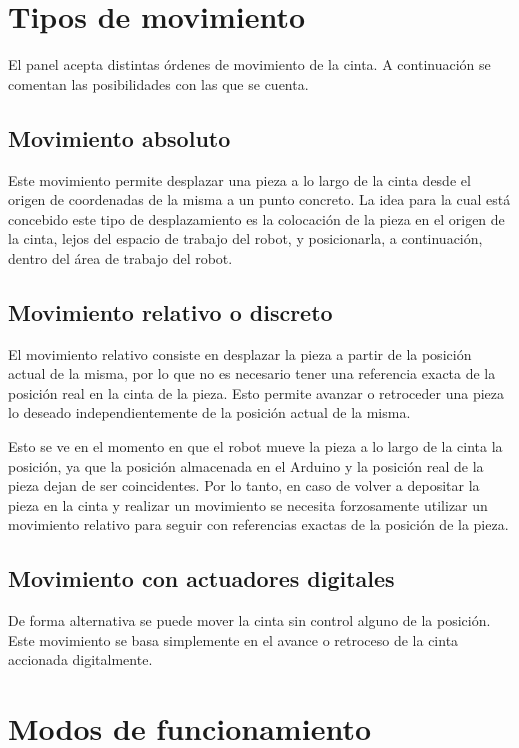 \section{Tipos de movimiento}

El panel acepta distintas órdenes de movimiento de la cinta. A continuación se comentan las posibilidades con las que se cuenta.

\subsection{Movimiento absoluto}

Este movimiento permite desplazar una pieza a lo largo de la cinta desde el origen de coordenadas de la misma a un punto concreto. La idea para la cual está concebido este tipo de desplazamiento es la colocación de la pieza en el origen de la cinta, lejos del espacio de trabajo del robot, y posicionarla, a continuación, dentro del área de trabajo del robot.

\subsection{Movimiento relativo o discreto}

El movimiento relativo consiste en desplazar la pieza a partir de la posición actual de la misma, por lo que no es necesario tener una referencia exacta de la posición real en la cinta de la pieza. Esto permite avanzar o retroceder una pieza lo deseado independientemente de la posición actual de la misma.

Esto se ve en el momento en que el robot mueve la pieza a lo largo de la cinta la posición, ya que la posición almacenada en el Arduino y la posición real de la pieza dejan de ser coincidentes. Por lo tanto, en caso de volver a depositar la pieza en la cinta y realizar un movimiento se necesita forzosamente utilizar un movimiento relativo para seguir con referencias exactas de la posición de la pieza.

\subsection{Movimiento con actuadores digitales}

De forma alternativa se puede mover la cinta sin control alguno de la posición. Este movimiento se basa simplemente en el avance o retroceso de la cinta accionada digitalmente.

\section{Modos de funcionamiento}

